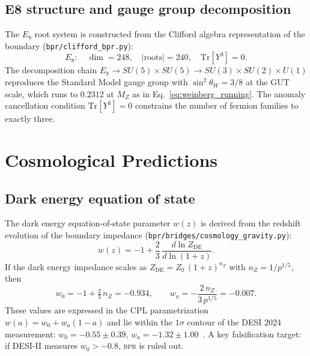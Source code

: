 \documentclass[aps,prd,twocolumn,superscriptaddress,longbibliography,nofootinbib]{revtex4-2}
\newcommand{\sinW}{\sin^2\!\theta_W}
\newcommand{\MZ}{M_Z}
\newcommand{\Zimp}{Z}
\newcommand{\Zvac}{Z_0}
\newcommand{\bpr}{\textsc{bpr}}
\begin{document}
\subsection{E8 structure and gauge group decomposition}

The $E_8$ root system is constructed from the Clifford algebra
representation of the boundary (\texttt{bpr/clifford\_bpr.py}):
\begin{equation}
E_8: \quad \dim = 248, \quad |\text{roots}| = 240, \quad
\mathrm{Tr}[Y^3] = 0.
\label{eq:e8}
\end{equation}
The decomposition chain $E_8 \to SU(5) \times SU(5) \to SU(3)
\times SU(2) \times U(1)$ reproduces the Standard Model gauge group
with $\sinW = 3/8$ at the GUT scale, which runs to $0.2312$ at
$\MZ$ as in Eq.~\eqref{eq:weinberg_running}.  The anomaly
cancellation condition $\mathrm{Tr}[Y^3] = 0$ constrains the number
of fermion families to exactly three.


\section{Cosmological Predictions}
\label{sec:cosmo}

\subsection{Dark energy equation of state}

The dark energy equation-of-state parameter $w(z)$ is derived from
the redshift evolution of the boundary impedance
(\texttt{bpr/bridges/cosmology\_gravity.py}):
\begin{equation}
w(z) = -1 + \frac{2}{3}\, \frac{d\ln \Zimp_{\mathrm{DE}}}{d\ln(1+z)}.
\label{eq:wz}
\end{equation}
If the dark energy impedance scales as $\Zimp_{\mathrm{DE}} =
\Zvac\, (1+z)^{n_Z}$ with $n_Z = 1/p^{1/5}$, then
\begin{equation}
w_0 = -1 + \tfrac{2}{3}\, n_Z = -0.934, \qquad
w_a = -\frac{2\, n_Z}{3\, p^{1/5}} = -0.007.
\label{eq:w0wa}
\end{equation}
These values are expressed in the CPL parametrization $w(a) = w_0 +
w_a(1-a)$ and lie within the $1\sigma$ contour of the DESI 2024
measurement: $w_0 = -0.55 \pm 0.39$, $w_a = -1.32 \pm
1.00$~\cite{DESI2024}.  A key falsification target: if DESI-II
measures $w_0 > -0.8$, \bpr{} is ruled out.
\end{document}

